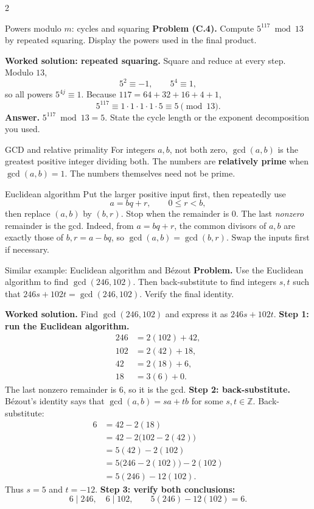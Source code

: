 \documentclass[10pt]{article}
\newcommand{\Z}{\mathbb Z}
\newcommand{\term}[1]{\textbf{\color{DivNavy}#1}}
\begin{document}
\begin{multicols}{2}
\begin{methodbox}{Powers modulo $m$: cycles and squaring}
\textbf{Problem (C.4).} Compute $5^{117}\bmod13$ by repeated squaring. Display the powers used in the final product.

\textbf{Worked solution: repeated squaring.} Square and reduce at every step. Modulo $13$,
\[
5^2\equiv-1,\qquad5^4\equiv1,
\]
so all powers $5^{4j}\equiv1$. Because
$117=64+32+16+4+1$,
\[
5^{117}\equiv1\cdot1\cdot1\cdot1\cdot5\equiv5\pmod{13}.
\]
\textbf{Answer.} $5^{117}\bmod13=5$. State the cycle length or the exponent decomposition you used.
\end{methodbox}


\begin{definitionbox}{GCD and relative primality}
For integers $a,b$, not both zero, $\gcd(a,b)$ is the greatest positive
integer dividing both. The numbers are \term{relatively prime} when
$\gcd(a,b)=1$. The numbers themselves need not be prime.
\end{definitionbox}

\begin{methodbox}{Euclidean algorithm}
Put the larger positive input first, then repeatedly use
\[
a=bq+r,\qquad0\le r<b,
\]
then replace $(a,b)$ by $(b,r)$. Stop when the remainder is $0$. The last
\emph{nonzero} remainder is the gcd. Indeed, from $a=bq+r$, the common
divisors of $a,b$ are exactly those of $b,r=a-bq$, so
$\gcd(a,b)=\gcd(b,r)$. Swap the inputs first if necessary.
\end{methodbox}

\begin{workedbox}{Similar example: Euclidean algorithm and B\'ezout}
\textbf{Problem.} Use the Euclidean algorithm to find $\gcd(246,102)$. Then back-substitute to find integers $s,t$ such that $246s+102t=\gcd(246,102)$. Verify the final identity.

\textbf{Worked solution.} Find $\gcd(246,102)$ and express it as $246s+102t$.
\textbf{Step 1: run the Euclidean algorithm.}
\[
\begin{aligned}
246&=2(102)+42,\\
102&=2(42)+18,\\
42&=2(18)+6,\\
18&=3(6)+0.
\end{aligned}
\]
The last nonzero remainder is $6$, so it is the gcd. \textbf{Step 2:
back-substitute.} B\'ezout's identity says that
$\gcd(a,b)=sa+tb$ for some $s,t\in\Z$. Back-substitute:
\[
\begin{aligned}
6&=42-2(18)\\
 &=42-2\bigl(102-2(42)\bigr)\\
 &=5(42)-2(102)\\
 &=5\bigl(246-2(102)\bigr)-2(102)\\
 &=5(246)-12(102).
\end{aligned}
\]
Thus $s=5$ and $t=-12$. \textbf{Step 3: verify both conclusions:}
\[
6\mid246,\quad6\mid102,\qquad5(246)-12(102)=6.
\]


\end{workedbox}
\end{multicols}
\end{document}

